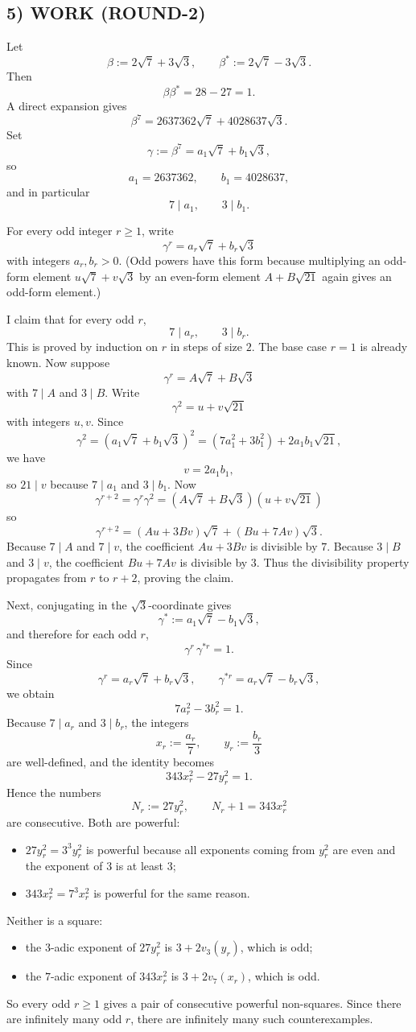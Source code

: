 \subsection*{5) WORK (ROUND-2)}
Let
\[
\beta:=2\sqrt{7}+3\sqrt{3},\qquad \beta^{\ast}:=2\sqrt{7}-3\sqrt{3}.
\]
Then
\[
\beta\beta^{\ast}=28-27=1.
\]
A direct expansion gives
\[
\beta^7=2637362\sqrt{7}+4028637\sqrt{3}.
\]
Set
\[
\gamma:=\beta^7=a_1\sqrt{7}+b_1\sqrt{3},
\]
so
\[
a_1=2637362,\qquad b_1=4028637,
\]
and in particular
\[
7\mid a_1,\qquad 3\mid b_1.
\]

For every odd integer $r\ge 1$, write
\[
\gamma^r=a_r\sqrt{7}+b_r\sqrt{3}
\]
with integers $a_r,b_r>0$. (Odd powers have this form because multiplying an odd-form element $u\sqrt7+v\sqrt3$ by an even-form element $A+B\sqrt{21}$ again gives an odd-form element.)

I claim that for every odd $r$,
\[
7\mid a_r,\qquad 3\mid b_r.
\]
This is proved by induction on $r$ in steps of size $2$.
The base case $r=1$ is already known.
Now suppose
\[
\gamma^r=A\sqrt7+B\sqrt3
\]
with $7\mid A$ and $3\mid B$.
Write
\[
\gamma^2=u+v\sqrt{21}
\]
with integers $u,v$. Since
\[
\gamma^2=(a_1\sqrt7+b_1\sqrt3)^2=(7a_1^2+3b_1^2)+2a_1b_1\sqrt{21},
\]
we have
\[
v=2a_1b_1,
\]
so $21\mid v$ because $7\mid a_1$ and $3\mid b_1$.
Now
\[
\gamma^{r+2}=\gamma^r\gamma^2=(A\sqrt7+B\sqrt3)(u+v\sqrt{21})
\]
so
\[
\gamma^{r+2}=(Au+3Bv)\sqrt7+(Bu+7Av)\sqrt3.
\]
Because $7\mid A$ and $7\mid v$, the coefficient $Au+3Bv$ is divisible by $7$.
Because $3\mid B$ and $3\mid v$, the coefficient $Bu+7Av$ is divisible by $3$.
Thus the divisibility property propagates from $r$ to $r+2$, proving the claim.

Next, conjugating in the $\sqrt3$-coordinate gives
\[
\gamma^{\ast}:=a_1\sqrt7-b_1\sqrt3,
\]
and therefore for each odd $r$,
\[
\gamma^r\,\gamma^{\ast r}=1.
\]
Since
\[
\gamma^r=a_r\sqrt7+b_r\sqrt3,
\qquad
\gamma^{\ast r}=a_r\sqrt7-b_r\sqrt3,
\]
we obtain
\[
7a_r^2-3b_r^2=1.
\]
Because $7\mid a_r$ and $3\mid b_r$, the integers
\[
x_r:=\frac{a_r}{7},\qquad y_r:=\frac{b_r}{3}
\]
are well-defined, and the identity becomes
\[
343x_r^2-27y_r^2=1.
\]
Hence the numbers
\[
N_r:=27y_r^2,
\qquad
N_r+1=343x_r^2
\]
are consecutive.
Both are powerful:
\begin{itemize}
\item $27y_r^2=3^3y_r^2$ is powerful because all exponents coming from $y_r^2$ are even and the exponent of $3$ is at least $3$;
\item $343x_r^2=7^3x_r^2$ is powerful for the same reason.
\end{itemize}
Neither is a square:
\begin{itemize}
\item the $3$-adic exponent of $27y_r^2$ is $3+2v_3(y_r)$, which is odd;
\item the $7$-adic exponent of $343x_r^2$ is $3+2v_7(x_r)$, which is odd.
\end{itemize}
So every odd $r\ge 1$ gives a pair of consecutive powerful non-squares.
Since there are infinitely many odd $r$, there are infinitely many such counterexamples.

